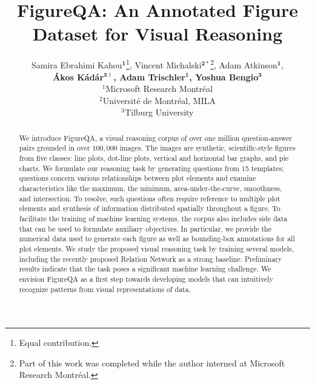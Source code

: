 \documentclass{article} \usepackage{iclr2018_workshop,times}
\title{FigureQA: An Annotated Figure Dataset for Visual Reasoning}
\author{
Samira Ebrahimi Kahou$\mathbf{^1}$\thanks{Equal contribution.}, Vincent Michalski$\mathbf{^{2\ast}}$\thanks{Part of this work was completed while the author interned at Microsoft Research Montréal.}, Adam Atkinson$\mathbf{^1}$, \\\textbf{Ákos Kádár$\mathbf{^{3\dag}}$, Adam Trischler$\mathbf{^1}$, Yoshua Bengio$\mathbf{^3}$}\\
$^1$Microsoft Research Montréal\\
$^2$Université de Montréal, MILA\\
$^3$Tilburg University
}
\begin{document}

\maketitle
\begin{abstract}
We introduce FigureQA, a visual reasoning corpus of over one million question-answer pairs grounded in over $100,000$ images.
The images are synthetic, scientific-style figures from five classes: line plots, dot-line plots, vertical and horizontal bar graphs, and pie charts.
We formulate our reasoning task by generating questions from 15 templates; questions concern various relationships between plot elements and examine characteristics like the maximum, the minimum, area-under-the-curve, smoothness, and intersection.
To resolve, such questions often require reference to multiple plot elements and synthesis of information distributed spatially throughout a figure.
To facilitate the training of machine learning systems, the corpus also includes side data that can be used to formulate auxiliary objectives. In particular,
we provide the numerical data used to generate each figure as well as bounding-box annotations for all plot elements.
We study the proposed visual reasoning task by training several models, including the recently proposed Relation Network as a strong baseline.
Preliminary results indicate that the task poses a significant machine learning challenge.
We envision FigureQA as a first step towards developing models that can intuitively recognize patterns from visual representations of data.
\end{abstract}
\end{document}

